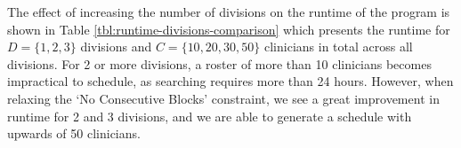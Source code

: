 The effect of increasing the number of divisions %
on the runtime of the program is shown in Table \ref{tbl:runtime-divisions-comparison} which presents the runtime for $D = \{1, 2, 3\}$ divisions and $C = \{10, 20, 30, 50\}$ clinicians in total across all divisions. For 2 or more divisions, a roster of more than 10 clinicians becomes impractical to schedule, as searching requires more than 24 hours. However, when relaxing the `No Consecutive Blocks' constraint, we see a great improvement in runtime for 2 and 3 divisions, and we are able to generate a schedule with upwards of 50 clinicians.  %




